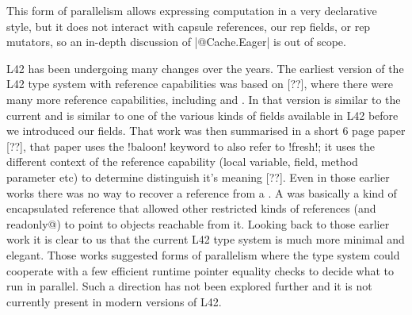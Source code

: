 This form of parallelism allows expressing computation in a very declarative style, but it does not interact with capsule references, our rep fields, or rep mutators, so an in-depth discussion of \Q|@Cache.Eager| is out of scope.

L42 has been undergoing many changes over the years.
The earliest version of the L42 type system with reference capabilities was based on [??],
where there were many more reference capabilities, including
\Q@fresh@ and \Q@baloon@.
In that version \Q@fresh@ is similar to the current \Q@capsule@ and \Q@baloon@ is similar to one of the various kinds of \Q@capsule@ fields available in L42 before we introduced our \Q@rep@ fields.
That work was then summarised in a short 6 page paper [??], that
paper uses the \Q!baloon! keyword to also refer to \Q!fresh!; it uses the different context of the reference capability (local variable, field, method parameter etc) to determine distinguish it's meaning [??].
Even in those earlier works there was no way to recover a \Q@fresh@ reference from a \Q@baloon@. A \Q@baloon@ was basically a kind of encapsulated reference that allowed other restricted kinds of references (\Q@external@ and \Q@external readonly@) to point to objects reachable from it. Looking back to those earlier work it is clear to us that the current L42 type system is much more minimal and elegant.
Those works suggested forms of parallelism where the type system could cooperate with a few efficient runtime pointer equality checks to decide what to run in parallel.
Such a direction has not been explored further and it is not currently present in modern versions of L42.
